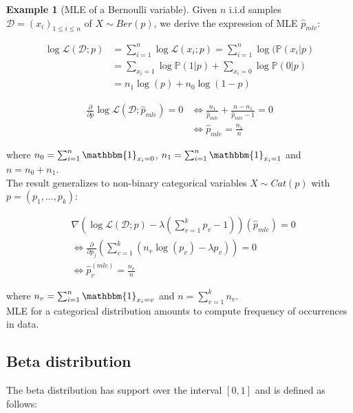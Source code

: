 \documentclass[12pt, a4paper]{article}
\theoremstyle{definition}
\newtheorem{example}{Example}[section]
\numberwithin{figure}{section}
\numberwithin{equation}{section}
\numberwithin{table}{section}
\begin{document}
\begin{example}[MLE of a Bernoulli variable]
Given $n$ i.i.d samples $\mathcal{D} = (x_i)_{1 \leq i \leq n}$ of $X \sim Ber(p)$, we derive the expression of MLE $\hat{p}_{mle}$:

\begin{align}
\log \mathcal{L}(\mathcal{D};p) &= \sum_{i=1}^{n} \log \mathcal{L}(x_i; p) = \sum_{i=1}^{n} \log (\mathbb{P}(x_i | p)\\
&= \sum_{x_i=1} \log \mathbb{P}(1| p) + \sum_{x_i=0} \log \mathbb{P}(0| p)\\
&= n_1 \log(p) + n_0 \log(1 - p)
\end{align}

\begin{align}
\frac{\partial}{\partial p} \log \mathcal{L}(\mathcal{D};\hat{p}_{mle}) = 0
&\Leftrightarrow \frac{n_1}{\hat{p}_{mle}} + \frac{n - n_1}{\hat{p}_{mle} - 1} = 0 \\
&\Leftrightarrow \hat{p}_{mle} = \frac{n_1}{n}
\end{align}

where $n_0=\sum_{i=1}^{n} \mathbbm{1}_{x_i=0}$, $n_1=\sum_{i=1}^{n} \mathbbm{1}_{x_i=1}$ and $n=n_0+n_1$.\\

The result generalizes to non-binary categorical variables $X \sim Cat(p)$ with $p = (p_1, ..., p_k)$:

\begin{align}
&\nabla \left( \log \mathcal{L}(\mathcal{D};p) - \lambda \left( \sum_{v=1}^{k} p_v - 1 \right) \right)(\hat{p}_{mle}) = 0\\
&\Leftrightarrow \frac{\partial}{\partial p_j} \left( \sum_{v=1}^{k} (n_v \log(p_v) - \lambda p_v) \right) = 0 \\
&\Leftrightarrow \hat{p}_v^{(mle)} = \frac{n_v}{n}
\end{align}

where $n_v=\sum_{i=1}^{n} \mathbbm{1}_{x_i=v}$ and $n=\sum_{v=1}^{k} n_v$.\\

MLE for a categorical distribution amounts to compute frequency of occurrences in data.
\end{example}

\subsection{Beta distribution}
The beta distribution has support over the interval $[0,1]$ and is defined as follows:
\end{document}
